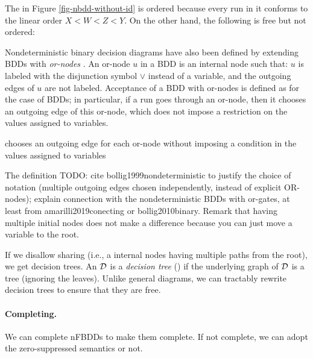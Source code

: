 \begin{example}
The \nbdd in Figure \ref{fig-nbdd-without-id} is ordered because every run in it conforms to the linear order $X < W < Z < Y$. On the other hand, the following \nbdd is free but not ordered:
\begin{center}

\end{center}
\end{example}



Nondeterministic binary decision
diagrams have also been defined by extending BDDs with {\em or-nodes} \citep{ACMS20,DBSSWCH10}. An or-node $u$ in a BDD is an internal node such that: $u$ is labeled with the disjunction symbol $\vee$ instead of a variable, and the outgoing edges of $u$ are not labeled. Acceptance of a BDD with or-nodes is defined as for the case of BDDs; in particular, if a run goes through an or-node, then it chooses an outgoing edge of this or-node, which does not impose a restriction on the values assigned to variables.


chooses an outgoing edge for each or-node without imposing a condition in the values assigned to variables

The definition 
TODO: cite bollig1999nondeterministic to justify the choice of notation (multiple outgoing edges chosen independently, instead of explicit OR-nodes); explain connection with the nondeterministic BDDs with or-gates, at least from amarilli2019conecting or bollig2010binary. Remark that having multiple initial nodes does not make a difference because you can just move a variable to the root.



If we disallow sharing (i.e., a internal nodes having multiple paths from the root), we get decision trees.
An \nbdd $\mathcal{D}$ is a \emph{decision tree} (\ndt) if the underlying graph of $\mathcal{D}$ is a tree (ignoring the leaves).
Unlike general diagrams, we can tractably rewrite decision trees to ensure that they are free.


\paragraph*{Completing.}
We can complete nFBDDs \cite[Lemma 8.4]{ACMS20} to make them complete. If not complete, we can adopt the zero-suppressed semantics or not.

